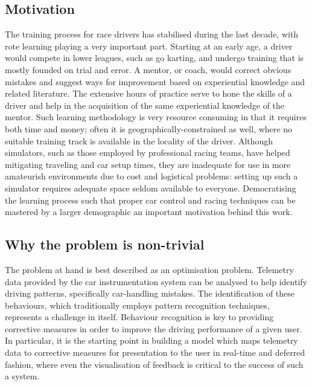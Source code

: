 \documentclass{article}
\begin{document}
\subsection{Motivation}
The training process for race drivers has stabilised during the last decade, with rote learning playing a very important part. Starting at an early age, a driver would compete in lower leagues, such as go karting, and undergo training that is mostly founded on trial and error. A mentor, or coach, would correct obvious mistakes and suggest ways for improvement based on experiential knowledge and related literature. The extensive hours of practice serve to hone the skills of a driver and help in the acquisition of the same experiential knowledge of the mentor. Such learning methodology is very resource consuming in that it requires both time and money; often it is geographically-constrained as well, where no suitable training track is available in the locality of the driver. Although simulators, such as those employed by professional racing teams, have helped mitigating traveling and car setup times, they are inadequate for use in more amateurish environments due to cost and logistical problems: setting up such a simulator requires adequate space seldom available to everyone. Democratising the learning process such that proper car control and racing techniques can be mastered by a larger demographic an important motivation behind this work.

\subsection{Why the problem is non-trivial}
The problem at hand is best described as an optimisation problem. Telemetry data provided by the car instrumentation system can be analysed to help identify driving patterns, specifically car-handling mistakes. The identification of these behaviours, which traditionally employs pattern recognition techniques, represents a challenge in itself. Behaviour recognition is key to providing corrective measures in order to improve the driving performance of a given user. In particular, it is the starting point in building a model which maps telemetry data to corrective measures for presentation to the user in real-time and deferred fashion, where even the visualisation of feedback is critical to the success of such a system.

\newpage


\newpage

\end{document}
